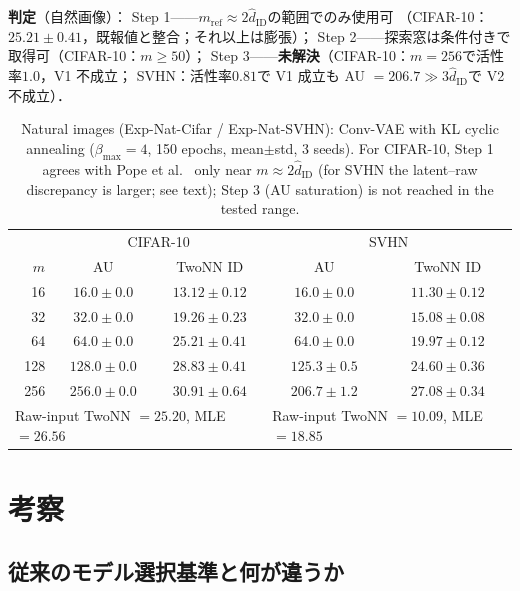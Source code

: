 \documentclass[11pt,a4paper]{jsarticle}
\newcommand{\hatdID}{\hat{d}_{\mathrm{ID}}}
\begin{document}
\textbf{判定}（自然画像）：
Step 1——$m_{\mathrm{ref}} \approx 2\hatdID$の範囲でのみ使用可
（CIFAR-10：$25.21 \pm 0.41$，既報値と整合；それ以上は膨張）；
Step 2——探索窓は条件付きで取得可（CIFAR-10：$m \geq 50$）；
Step 3——\textbf{未解決}（CIFAR-10：$m = 256$で活性率$1.0$，V1 不成立；
SVHN：活性率$0.81$で V1 成立も AU $= 206.7 \gg 3\hatdID$で V2 不成立）．

\begin{table}[H]
\centering
\caption{Natural images (Exp-Nat-Cifar / Exp-Nat-SVHN): Conv-VAE with KL
cyclic annealing ($\beta_{\max} = 4$, 150 epochs, mean$\pm$std, 3 seeds).
For CIFAR-10, Step 1 agrees with Pope et al.~\cite{pope2021intrinsic} only
near $m \approx 2\hatdID$ (for SVHN the latent--raw discrepancy is larger;
see text); Step 3 (AU saturation) is not reached in the tested range.}
\label{tab:natural}
\small
\begin{tabular}{r cc | cc}
\toprule
 & \multicolumn{2}{c|}{CIFAR-10} & \multicolumn{2}{c}{SVHN} \\
$m$ & AU & TwoNN ID & AU & TwoNN ID \\
\midrule
 16 & $16.0 \pm 0.0$ & $13.12 \pm 0.12$ & $16.0 \pm 0.0$ & $11.30 \pm 0.12$ \\
 32 & $32.0 \pm 0.0$ & $19.26 \pm 0.23$ & $32.0 \pm 0.0$ & $15.08 \pm 0.08$ \\
 64 & $64.0 \pm 0.0$ & $\mathbf{25.21 \pm 0.41}$ & $64.0 \pm 0.0$ & $19.97 \pm 0.12$ \\
128 & $128.0 \pm 0.0$ & $28.83 \pm 0.41$ & $125.3 \pm 0.5$ & $24.60 \pm 0.36$ \\
256 & $256.0 \pm 0.0$ & $30.91 \pm 0.64$ & $206.7 \pm 1.2$ & $27.08 \pm 0.34$ \\
\midrule
\multicolumn{3}{l|}{Raw-input TwoNN $= 25.20$, MLE $= 26.56$} &
\multicolumn{2}{l}{Raw-input TwoNN $= 10.09$, MLE $= 18.85$} \\
\bottomrule
\end{tabular}
\end{table}

\section{考察}\label{sec:discussion}

\subsection{従来のモデル選択基準と何が違うか}\label{sec:disc_model_selection}
\end{document}
